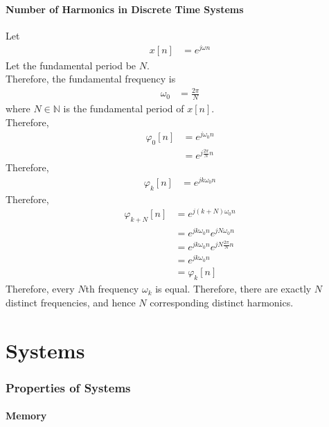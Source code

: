 \documentclass[titlepage, fleqn, a4paper, 12pt, twoside]{article}
\theoremstyle{definition}
\theoremstyle{theorem}
\begin{document}
\subsection{Number of Harmonics in Discrete Time Systems}

Let
\begin{align*}
	x[n] & = e^{j \omega n}
\end{align*}
Let the fundamental period be $N$.\\
Therefore, the fundamental frequency is
\begin{align*}
	\omega_0 & = \frac{2 \pi}{N}
\end{align*}
where $N \in \mathbb{N}$ is the fundamental period of $x[n]$.\\
Therefore,
\begin{align*}
	\varphi_0[n] & = e^{j \omega_0 n} \\
                     & = e^{j \frac{2 \pi}{N} n}
\end{align*}
Therefore,
\begin{align*}
	\varphi_k[n] & = e^{j k \omega_0 n}
\end{align*}
Therefore,
\begin{align*}
	\varphi_{k + N}[n] & = e^{j (k + N) \omega_0 n}                     \\
                           & = e^{j k \omega_0 n} e^{j N \omega_0 n}        \\
                           & = e^{j k \omega_0 n} e^{j N \frac{2 \pi}{N} n} \\
                           & = e^{j k \omega_0 n}                           \\
                           & = \varphi_k[n]
\end{align*}
Therefore, every $N$th frequency $\omega_k$ is equal.
Therefore, there are exactly $N$ distinct frequencies, and hence $N$ corresponding distinct harmonics.

\clearpage
\part{Systems}

\section{Properties of Systems}

\subsection{Memory}
\end{document}
